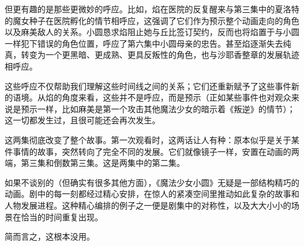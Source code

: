但更有趣的是那些更微妙的呼应。比如，焰在医院的反复醒来与第三集中的夏洛特的魔女种子在医院孵化的情节相呼应，这强调了它们作为预示整个动画走向的角色以及麻美敌人的关系。小圆恳求焰阻止她与丘比签订契约，反而也将焰置于与小圆一样犯下错误的角色位置，呼应了第六集中小圆母亲的忠告。甚至焰逐渐失去纯真，转变为一个更黑暗、更成熟、更具反叛性的角色，也与沙耶香整章的发展轨迹相呼应。

这些呼应不仅帮助我们理解这些时间线之间的关系；它们还重新赋予了这些事件新的语境。从焰的角度来看，这些并不是呼应，而是预示（正如某些事件也对观众来说是预示一样，比如麻美是第一个攻击其他魔法少女的暗示着《叛逆》的情节）；这一切都发生过，且很可能还会再次发生。

这两集彻底改变了整个故事。第一次观看时，这两话让人有种：原本似乎是关于某件事情的故事，突然转向了完全不同的发展。它们就像镜子一样，安置在动画的两端，第三集和倒数第三集。这是两集中的第二集。

如果不谈别的（但确实有很多其他方面），《魔法少女小圆》无疑是一部结构精巧的动画。剧中的每一刻都经过精心安排，在惊人的紧凑空间里推动如此复杂的故事和人物发展进程。这种精心编排的例子之一便是剧集中的对称性，以及大大小小的场景在恰当的时间重复出现。

简而言之，这根本没用。
